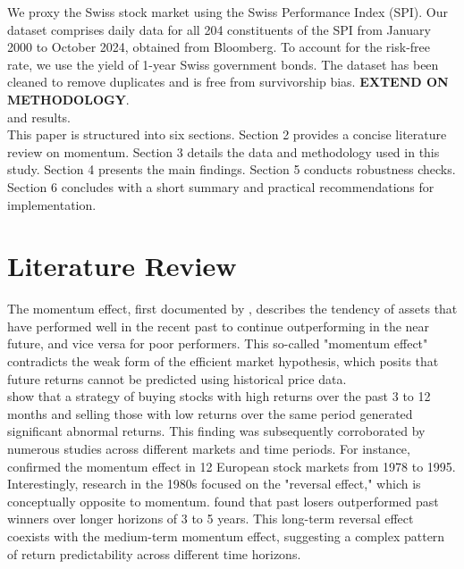 \documentclass{article}
\begin{document}
We proxy the Swiss stock market using the Swiss Performance Index (SPI). Our dataset comprises daily data for all 204 constituents of the SPI from January 2000 to October 2024, obtained from Bloomberg. To account for the risk-free rate, we use the yield of 1-year Swiss government bonds. The dataset has been cleaned to remove duplicates and is free from survivorship bias. \textbf{EXTEND ON METHODOLOGY}. \\

and results. \\

This paper is structured into six sections. Section 2 provides a concise literature review on momentum. Section 3 details the data and methodology used in this study. Section 4 presents the main findings. Section 5 conducts robustness checks. Section 6 concludes with a short summary and practical recommendations for implementation.

\newpage

\section{Literature Review}
The momentum effect, first documented by \cite{jegatit1993}, describes the tendency of assets that have performed well in the recent past to continue outperforming in the near future, and vice versa for poor performers. This so-called "momentum effect" contradicts the weak form of the efficient market hypothesis, which posits that future returns cannot be predicted using historical price data. \\

\cite{jegatit1993} show that a strategy of buying stocks with high returns over the past 3 to 12 months and selling those with low returns over the same period generated significant abnormal returns. This finding was subsequently corroborated by numerous studies across different markets and time periods. For instance, \cite{rouwenhorst1998} confirmed the momentum effect in 12 European stock markets from 1978 to 1995. \\

Interestingly, research in the 1980s focused on the "reversal effect," which is conceptually opposite to momentum. \cite{debondt1987} found that past losers outperformed past winners over longer horizons of 3 to 5 years. This long-term reversal effect coexists with the medium-term momentum effect, suggesting a complex pattern of return predictability across different time horizons. \\
\end{document}
